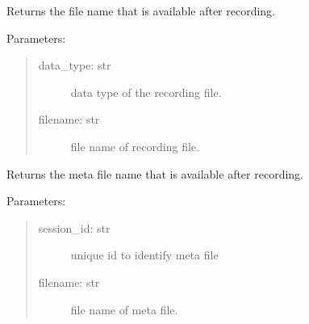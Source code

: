 \documentclass[letterpaper,10pt,english]{sphinxmanual}
\begin{document}

\begin{fulllineitems}
\label{\detokenize{X4 radar:X4_record_playback.on_file_available}}
Returns the file name that is available after recording.

Parameters:
\begin{quote}
\begin{description}
\item[{data\_type: str}] \leavevmode
data type of the recording file.

\item[{filename: str}] \leavevmode
file name of recording file.

\end{description}
\end{quote}

\end{fulllineitems}


\begin{fulllineitems}
\label{\detokenize{X4 radar:X4_record_playback.on_meta_file_available}}
Returns the meta file name that is available after recording.

Parameters:
\begin{quote}
\begin{description}
\item[{session\_id: str}] \leavevmode
unique id to identify meta file

\item[{filename: str}] \leavevmode
file name of meta file.

\end{description}
\end{quote}

\end{fulllineitems}

\end{document}
